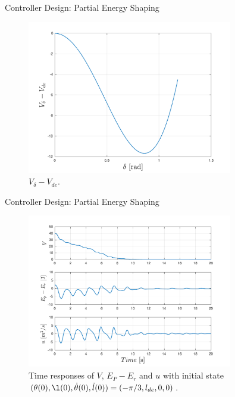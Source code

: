 \documentclass[10pt]{beamer}
\begin{document}
  \begin{frame}{Controller Design: Partial Energy Shaping}
    \begin{figure}
      \caption{$V_\delta-V_{de}$.}
      \vspace{-0.3cm}
      \includegraphics[width=0.8\textwidth]{images/partial_3.pdf}
    \end{figure}
  \end{frame}

  \begin{frame}{Controller Design: Partial Energy Shaping}
    \begin{figure}
      \caption{Time responses of $V$, $E_P-E_r$ and $u$ with initial state 
        $(\theta(0), \l(0), \dot{\theta}(0), \dot{l}(0))=(-\pi/3, l_{de}, 0,
        0)$.}
      \vspace{-0.3cm}
      \includegraphics[width=0.8\textwidth]{images/partial_1b.pdf}
    \end{figure}
  \end{frame}
\end{document}
